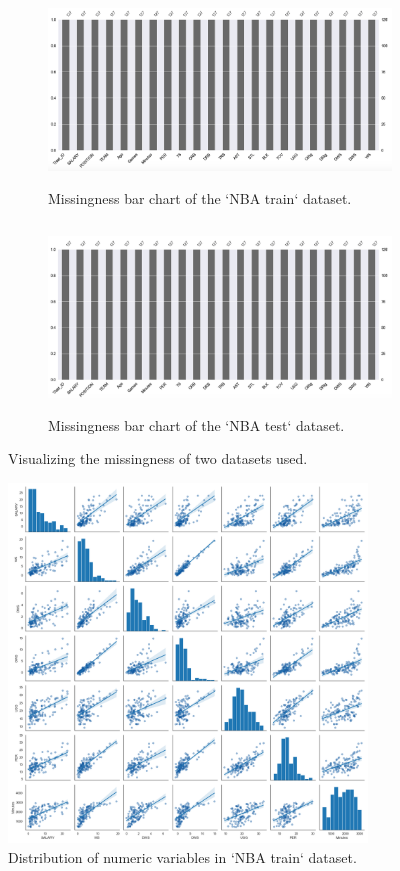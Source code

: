\documentclass[letterpaper,12pt,twoside,]{pinp}
\begin{document}
\begin{figure}
\begin{subfigure}{0.55\textwidth}
\includegraphics[width=0.9\linewidth, height=5cm]{nbaTrain_miss.png} 
\caption{Missingness bar chart of the `NBA train` dataset.}
\label{fig:trainMiss}
\end{subfigure}
\begin{subfigure}{0.55\textwidth}
\includegraphics[width=0.9\linewidth, height=5cm]{nbaTest_miss.png}
\caption{Missingness bar chart of the `NBA test` dataset.}
\label{fig:testMiss}
\end{subfigure}
\caption{Visualizing the missingness of two datasets used.}
\label{fig:missingness}
\end{figure}

\begin{figure}
\includegraphics[width=0.85\textwidth]{scatter.png}
\centering
\caption{Distribution of numeric variables in `NBA train` dataset.}
\label{fig:scatter}
\end{figure}
\end{document}
